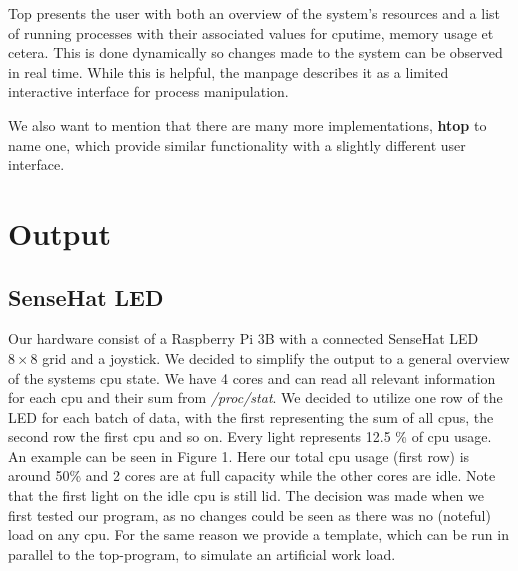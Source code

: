 \documentclass[twoside,twocolumn]{article}
\begin{document}
Top presents the user with both an overview of the system's resources and a list
of running processes with their associated values for cputime, memory usage et
cetera. This is done dynamically so changes made to the system can be observed
in real time. While this is helpful, the manpage describes it as a limited 
interactive interface for process manipulation. 

We also want to mention that there are many more implementations,
\textbf{htop} to name one, which provide similar functionality with a slightly
different user interface. 


\section{Output}

\subsection{SenseHat LED}

Our hardware consist of a Raspberry Pi 3B with a connected SenseHat LED $8\times
8$ grid and a joystick. We decided to simplify the output to a general overview
of the systems cpu state. We have 4 cores and can read all relevant
information for each cpu and their sum from \textit{/proc/stat}. We decided to
utilize one row of the LED for each batch of data, with the first representing the
sum of all cpus, the second row the first cpu and so on. Every light represents
12.5 \% of cpu usage. An example can be seen in Figure 1. Here our total cpu
usage (first row) is around 50\% and 2 cores are at full capacity while the
other cores are idle. Note that the first light on the idle cpu is still lid.
The decision was made when we first tested our program, as no changes could be
seen as there was no (noteful) load on any cpu. For the same reason we provide a
template, which can be run in parallel to the top-program, to simulate an
artificial work load. 
\end{document}
